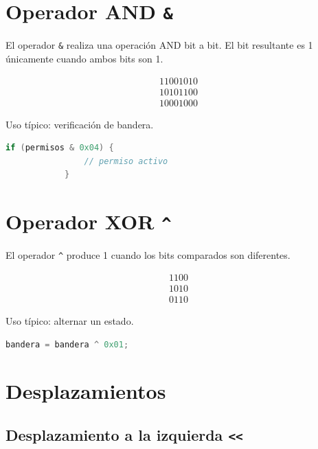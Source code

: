 \documentclass[12pt,twoside]{book}
\begin{document}
		\bigskip
		
		\section{Operador AND \texttt{\&}}
		
		\noindent
		El operador \texttt{\&} realiza una operación AND bit a bit. El bit resultante es 1 únicamente cuando ambos bits son 1.
		
		\[
		\begin{array}{r}
			11001010 \\
			10101100 \\
			\hline
			10001000
		\end{array}
		\]
		
		\noindent
		Uso típico: verificación de bandera.
		
		\begin{lstlisting}[language=C, caption={Verificación de una bandera con AND}]
			if (permisos & 0x04) {
				// permiso activo
			} \end{lstlisting}
		
		\section{Operador XOR \texttt{\textasciicircum }}
		\noindent
		El operador \texttt{\string^} produce 1 cuando los bits comparados son diferentes.
		
		\[
		\begin{array}{r}
			1100 \\
			1010 \\
			\hline
			0110
		\end{array}
		\]
		
		\noindent
		Uso típico: alternar un estado.
		
		\begin{lstlisting}[language=C, caption={Alternar un bit con XOR}]
			bandera = bandera ^ 0x01; \end{lstlisting}
		
		\section{Desplazamientos}
		
		\subsection{Desplazamiento a la izquierda \texttt{<<}}
		
\end{document}
